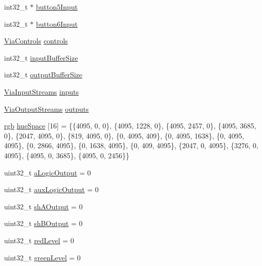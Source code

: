 \begin{DoxyCompactItemize}
\item 
int32\+\_\+t $\ast$ \mbox{\hyperlink{class_via_module_a550e4235cc5e384b6c1795bf34d28bf0}{button5\+Input}}
\item 
int32\+\_\+t $\ast$ \mbox{\hyperlink{class_via_module_a62df426e2268a7d0dbd0d321fbc1b962}{button6\+Input}}
\item 
\mbox{\hyperlink{class_via_controls}{Via\+Controls}} \mbox{\hyperlink{class_via_module_a24d1ee1ac6d103afc23f480156895e57}{controls}}
\item 
int32\+\_\+t \mbox{\hyperlink{class_via_module_a23de5840e07f0b427bda2d44d116287f}{input\+Buffer\+Size}}
\item 
int32\+\_\+t \mbox{\hyperlink{class_via_module_ad80e8f75d0c3770fb54b5a47a4c25d12}{output\+Buffer\+Size}}
\item 
\mbox{\hyperlink{class_via_input_streams}{Via\+Input\+Streams}} \mbox{\hyperlink{class_via_module_af04f1c8df2a0302a9364dfb99a9085dc}{inputs}}
\item 
\mbox{\hyperlink{class_via_output_streams}{Via\+Output\+Streams}} \mbox{\hyperlink{class_via_module_a2c55536ef4a2162940b5ae145e74f730}{outputs}}
\item 
\mbox{\hyperlink{structrgb}{rgb}} \mbox{\hyperlink{class_via_module_a3426e2c19cee84ade2831cae4b627ebb}{hue\+Space}} \mbox{[}16\mbox{]} = \{\{4095, 0, 0\}, \{4095, 1228, 0\}, \{4095, 2457, 0\}, \{4095, 3685, 0\}, \{2047, 4095, 0\}, \{819, 4095, 0\}, \{0, 4095, 409\}, \{0, 4095, 1638\}, \{0, 4095, 4095\}, \{0, 2866, 4095\}, \{0, 1638, 4095\}, \{0, 409, 4095\}, \{2047, 0, 4095\}, \{3276, 0, 4095\}, \{4095, 0, 3685\}, \{4095, 0, 2456\}\}
\item 
uint32\+\_\+t \mbox{\hyperlink{class_via_module_a1e14a3a43daabb612fa61b7d2ee40d63}{a\+Logic\+Output}} = 0
\item 
uint32\+\_\+t \mbox{\hyperlink{class_via_module_adfd4a85913ab03a59f5b1250aa5eefa8}{aux\+Logic\+Output}} = 0
\item 
uint32\+\_\+t \mbox{\hyperlink{class_via_module_aff6cc2fd90847c64a6320fd17c0da74a}{sh\+A\+Output}} = 0
\item 
uint32\+\_\+t \mbox{\hyperlink{class_via_module_a7cfbe5fe6b6afb143cb55ff53cdcc90e}{sh\+B\+Output}} = 0
\item 
uint32\+\_\+t \mbox{\hyperlink{class_via_module_a6b74dd873f71791543efb5affb4d4b77}{red\+Level}} = 0
\item 
uint32\+\_\+t \mbox{\hyperlink{class_via_module_a823f43c562e39858bfa1d2b1943dd2b5}{green\+Level}} = 0
\item 

\end{DoxyCompactItemize}
